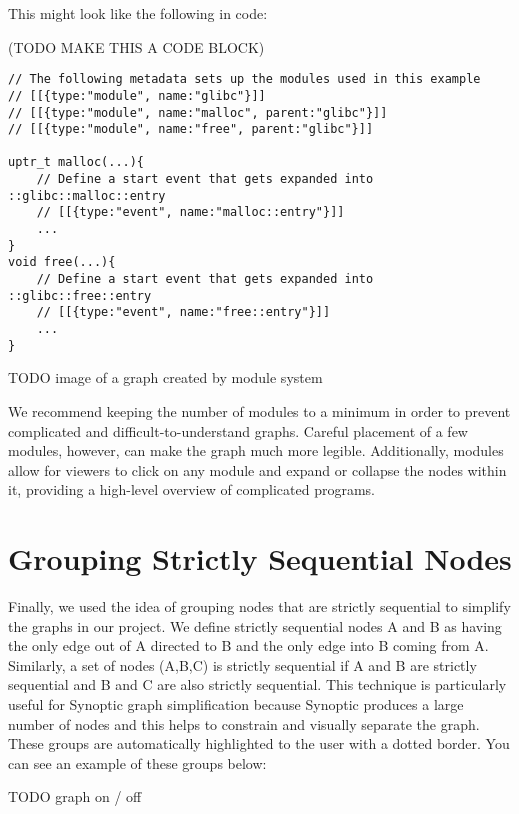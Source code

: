 This might look like the following in code:

(TODO MAKE THIS A CODE BLOCK)
\begin{verbatim}
// The following metadata sets up the modules used in this example
// [[{type:"module", name:"glibc"}]]
// [[{type:"module", name:"malloc", parent:"glibc"}]]
// [[{type:"module", name:"free", parent:"glibc"}]]

uptr_t malloc(...){
    // Define a start event that gets expanded into ::glibc::malloc::entry
    // [[{type:"event", name:"malloc::entry"}]]
    ...
}
void free(...){
    // Define a start event that gets expanded into ::glibc::free::entry
    // [[{type:"event", name:"free::entry"}]]
    ...
}
\end{verbatim}

TODO image of a graph created by module system

We recommend keeping the number of modules to a minimum in order to prevent complicated and difficult-to-understand graphs. Careful placement of a few modules, however, can make the graph much more legible. Additionally, modules allow for viewers to click on any module and expand or collapse the nodes within it, providing a high-level overview of complicated programs.


\section{Grouping Strictly Sequential Nodes}
Finally, we used the idea of grouping nodes that are strictly sequential to simplify the graphs in our project. We define strictly sequential nodes A and B as having the only edge out of A directed to B and the only edge into B coming from A. Similarly, a set of nodes (A,B,C) is strictly sequential if A and B are strictly sequential and B and C are also strictly sequential. This technique is particularly useful for Synoptic graph simplification because Synoptic produces a large number of nodes and this helps to constrain and visually separate the graph. These groups are automatically highlighted to the user with a dotted border. You can see an example of these groups below:

TODO graph on / off

